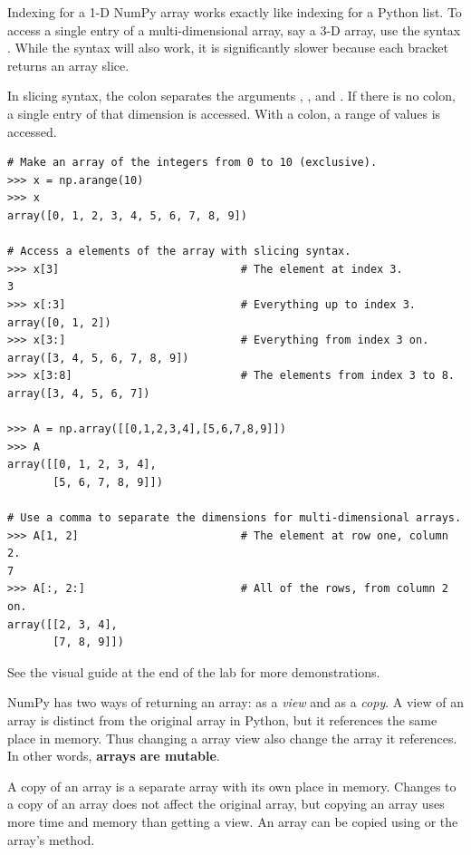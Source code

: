 Indexing for a 1-D NumPy array works exactly like indexing for a Python list.
To access a single entry of a multi-dimensional array, say a 3-D array, use the syntax .
While the syntax  will also work, it is significantly slower because each bracket returns an array slice.

In slicing syntax, the colon \li{:} separates the arguments , , and .
If there is no colon, a single entry of that dimension is accessed.
With a colon, a range of values is accessed.

\begin{lstlisting}
# Make an array of the integers from 0 to 10 (exclusive).
>>> x = np.arange(10)
>>> x
array([0, 1, 2, 3, 4, 5, 6, 7, 8, 9])

# Access a elements of the array with slicing syntax.
>>> x[3]                            # The element at index 3.
3
>>> x[:3]                           # Everything up to index 3.
array([0, 1, 2])
>>> x[3:]                           # Everything from index 3 on.
array([3, 4, 5, 6, 7, 8, 9])
>>> x[3:8]                          # The elements from index 3 to 8.
array([3, 4, 5, 6, 7])

>>> A = np.array([[0,1,2,3,4],[5,6,7,8,9]])
>>> A
array([[0, 1, 2, 3, 4],
       [5, 6, 7, 8, 9]])

# Use a comma to separate the dimensions for multi-dimensional arrays.
>>> A[1, 2]                         # The element at row one, column 2.
7
>>> A[:, 2:]                        # All of the rows, from column 2 on.
array([[2, 3, 4],
       [7, 8, 9]])
\end{lstlisting}

See the visual guide at the end of the lab for more demonstrations.

\begin{info} %
NumPy has two ways of returning an array: as a \emph{view} and as a \emph{copy}.
A view of an array is distinct from the original array in Python, but it references the same place in memory.
Thus changing a array view also change the array it references.
In other words, \textbf{arrays are mutable}.

A copy of an array is a separate array with its own place in memory.
Changes to a copy of an array does not affect the original array, but copying an array uses more time and memory than getting a view.
An array can be copied using  or the array's  method.
\end{info}

